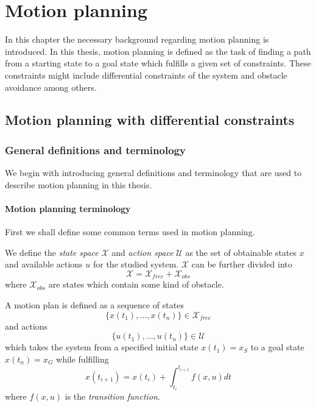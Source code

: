 \chapter{Motion planning}\label{cha:motion_planning}
In this chapter the necessary background regarding motion planning is 
introduced. In this thesis, motion planning is defined as the task of finding a
path from a starting state to a goal state which fulfills a given set of constraints.
These constraints might include differential constraints of the system and obstacle avoidance among others.

\section{Motion planning with differential constraints}
\subsection{General definitions and terminology}
We begin with introducing general definitions and terminology that are used to
describe motion planning in this thesis.
\subsubsection{Motion planning terminology}
First we shall define some common terms used in motion planning.

\begin{definition}
    We define the \textit{state space} $\mathcal{X}$ and \textit{action space}
    $\mathcal{U}$ as the set of obtainable states $x$ and available actions $u$ for the
    studied system.
    $\mathcal{X}$ can be further divided into
    \begin{equation}
        \mathcal{X} = \mathcal{X}_{free} + \mathcal{X}_{obs}
    \end{equation}
    where $\mathcal{X}_{obs}$ are states which contain some kind of obstacle. 
\end{definition}

\begin{definition}
    A motion plan is defined as a sequence of states
    \begin{equation}
        \{x(t_1),\hdots, x(t_n)\}\in\mathcal{X}_{free}
    \end{equation}
    and actions
    \begin{equation}
        \{u(t_1),\hdots,u(t_n)\}\in\mathcal{U}
    \end{equation}
    which takes the system from a specified initial state $x(t_1)=x_S$ to a 
    goal state $x(t_n)=x_G$ while fulfilling
    \begin{equation}
        x(t_{i+1})=x(t_i) + \int_{t_i}^{t_{i+1}} f(x, u) dt
    \end{equation}
    where $f(x, u)$ is the \textit{transition function}.
\end{definition}

